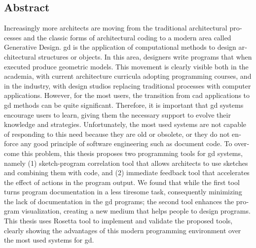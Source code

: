 
\begin{otherlanguage}{english}




\chapter*{Abstract}
\thispagestyle{empty}

Increasingly more architects are moving from the traditional architectural processes and the classic forms of architectural coding to a modern area called Generative Design. \gls{gd} is the application of computational methods to design architectural structures or objects. In this area, designers write programs that when executed produce geometric models. This movement is clearly visible both in the academia, with current architecture curricula adopting programming courses, and in the industry, with design studios replacing traditional processes with computer applications.  However, for the most users, the transition from \gls{cad} applications to \gls{gd} methods can be quite significant. Therefore, it is important that \gls{gd} systems encourage users to learn, giving them the necessary support to evolve their knowledge and strategies. Unfortunately, the most used systems are not capable of responding to this need because they are old or obsolete, or they do not enforce any good principle of software engineering such as document code. To overcome this problem, this thesis proposes two programming tools for \gls{gd}  systems, namely (1) sketch-program correlation tool that allows architects to use sketches and combining them with code, and (2) immediate feedback tool that accelerates the effect of actions in the program output. We found that while the first tool turns program documentation in a less tiresome task, consequently minimizing the lack of documentation in the  \gls{gd} programs; the second tool enhances the program visualization, creating a new medium that helps people to design programs. This thesis uses Rosetta tool to implement and validate the proposed tools, clearly showing the advantages of this modern programming environment over the most used systems for \gls{gd}.

\begin{flushleft}
\end{flushleft}

\end{otherlanguage}